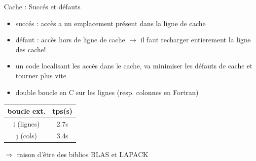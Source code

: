 \documentclass[11pt,mathserif]{beamer}
\begin{document}
\begin{frame}{Cache : Succés et défauts}
\begin{itemize}[<+->]
 \item succés : accès a un emplacement présent dans la ligne de cache 
 \item défaut : accès hors de ligne de cache $\rightarrow$ il faut recharger entierement la ligne des cache!
 \item un code localisant les accés dans le cache, va minimiser les défauts de cache et tourner plus vite
 \item double boucle en C sur les lignes (resp. colonnes en Fortran)
\end{itemize}
\pause
\begin{minipage}[c]{0.49\linewidth}
  
\end{minipage}
\begin{minipage}[c]{0.49\linewidth}
    \begin{tabular}{|c|c|}
    \hline
     boucle ext. & tps(s)  \\
    \hline
      i (lignes) & 2.7s \\
      j (cols)  & 3.4s \\
    \hline
    \end{tabular}
\end{minipage}
\pause 
 $\Rightarrow$ raison d'être des biblios BLAS et LAPACK
\end{frame}
\end{document}
